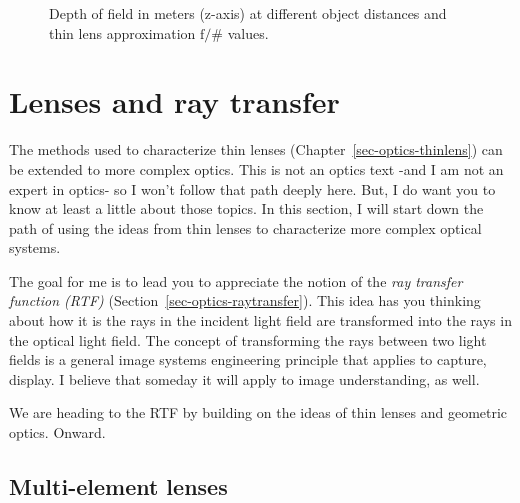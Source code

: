 \documentclass[
  letterpaper,
]{book}
\begin{document}
\begin{figure}


\caption{\label{fig-optics-dof}Depth of field in meters (z-axis) at
different object distances and thin lens approximation \(\mathrm{f}/\#\)
values.}

\end{figure}%

\chapter{Lenses and ray transfer}\label{sec-optics-morelenses}

The methods used to characterize thin lenses
(Chapter~\ref{sec-optics-thinlens}) can be extended to more complex
optics. This is not an optics text -and I am not an expert in optics- so
I won't follow that path deeply here. But, I do want you to know at
least a little about those topics. In this section, I will start down
the path of using the ideas from thin lenses to characterize more
complex optical systems.

The goal for me is to lead you to appreciate the notion of the \emph{ray
transfer function (RTF)} (Section~\ref{sec-optics-raytransfer}). This
idea has you thinking about how it is the rays in the incident light
field are transformed into the rays in the optical light field. The
concept of transforming the rays between two light fields is a general
image systems engineering principle that applies to capture, display. I
believe that someday it will apply to image understanding, as well.

We are heading to the RTF by building on the ideas of thin lenses and
geometric optics. Onward.

\section{Multi-element lenses}\label{sec-optics-multielement}
\end{document}
